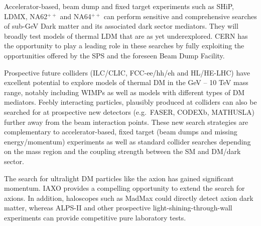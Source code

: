 Accelerator-based, beam dump and fixed target experiments such as SHiP, LDMX, NA62$^{++}$ and NA64$^{++}$ can perform sensitive and comprehensive searches of sub-GeV Dark matter and its associated dark sector mediators. They will broadly test models of thermal LDM that are as yet underexplored. CERN has the opportunity to play a leading role in these searches by fully exploiting the opportunities offered by the SPS and the foreseen Beam Dump Facility.

Prospective future colliders (ILC/CLIC, FCC-ee/hh/eh and HL/HE-LHC) have excellent potential to explore models of thermal DM in the GeV -- 10 TeV mass range, notably including WIMPs as well as models with different types of DM mediators. 
Feebly interacting particles, plausibly produced at colliders can also be searched for at prospective new detectors (e.g.\ FASER, CODEXb, MATHUSLA) further away from the beam interaction points. 
These new search strategies are complementary to accelerator-based, fixed target (beam dumps and missing energy/momentum) experiments as well as standard collider searches depending on the mass region and the coupling strength between the SM and DM/dark sector. 

The search for ultralight DM particles like the axion has gained significant momentum. IAXO  provides a compelling opportunity to extend the search for axions. In addition, haloscopes such as MadMax could directly detect axion dark matter, whereas ALPS-II and other prospective light-shining-through-wall experiments can provide competitive pure laboratory tests.





